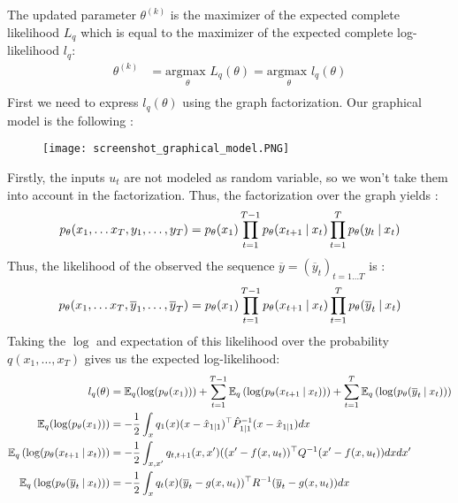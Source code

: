 The updated parameter $\theta^{(k)}$ is the maximizer of the expected complete likelihood $L_q$ which is equal to the maximizer of the expected complete log-likelihood $l_q$:
\begin{align*}
  \theta^{(k)} &= \underset{\theta}{\text{argmax }}L_q(\theta) = \underset{\theta}{\text{argmax }}l_q(\theta)\\
\end{align*}
First we need to express $l_q(\theta)$ using the graph factorization.
Our graphical model is the following :
\begin{figure}[H]
	\texttt{[image: screenshot\_graphical\_model.PNG]}
\end{figure}
Firstly, the inputs $u_t$ are not modeled as random variable, so we won't take them into account in the factorization.
Thus, the factorization over the graph yields :
\begin{align*}
p_{\theta}(x_1, \ldots x_T, y_1, \ldots , y_T) &= p_{\theta}(x_1) \prod_{t=1}^{T-1}{p_{\theta}(x_{t+1} \mathbin{\vert} x_t)} \prod_{t=1}^{T}{p_{\theta}(y_t \mathbin{\vert} x_t)}\\
\end{align*}
Thus, the likelihood of the observed the sequence $\overline{y} = (\overline{y}_t)_{t=1 \ldots T}$ is :
\begin{align*}
  p_{\theta}(x_1, \ldots x_T, \overline{y}_1, \ldots , \overline{y}_T) &= p_{\theta}(x_1) \prod_{t=1}^{T-1}{p_{\theta}(x_{t+1}\mathbin{\vert} x_t)} \prod_{t=1}^{T}{p_{\theta}(\overline{y}_t \mathbin{\vert} x_t)}\\
\end{align*}
Taking the $\log$ and expectation of this likelihood over the probability $q \left(x_1, \ldots ,x_T \right)$ gives us the expected log-likelihood:
\begin{align*}
  l_q(\theta) & =
    \mathbb{E}_q(\log(p_{\theta}(x_1))) +
    \sum_{t=1}^{T-1}{\mathbb{E}_q \left( \log(p_{\theta}(x_{t+1} \mathbin{\vert} x_t)) \right)} +
    \sum_{t=1}^{T}{\mathbb{E}_q\left( \log(p_{\theta}(\overline{y}_t \mathbin{\vert} x_t)) \right)}
  \\
  \mathbb{E}_q(\log(p_{\theta}(x_1))) &= -\frac{1}{2}\int_x{q_1(x) (x - \hat{x}_{1 \mathbin{\vert} 1})^{\top} \hat{P}_{1 \mathbin{\vert} 1}^{-1} (x - \hat{x}_{1 \mathbin{\vert} 1}) dx}
  \\
  \mathbb{E}_q \left( \log(p_{\theta}(x_{t+1} \mathbin{\vert} x_t)) \right) &= -\frac{1}{2}\int_{x,x'}{q_{t,t+1}(x, x') ((x' - f(x,u_t))^{\top} Q^{-1} (x' - f(x,u_t)) dxdx'}\\
  \mathbb{E}_q\left( \log(p_{\theta}(\overline{y}_t \mathbin{\vert} x_t)) \right) &= -\frac{1}{2}\int_x{q_t(x) (\overline{y}_t - g(x, u_t))^{\top} R^{-1} (\overline{y}_t - g(x, u_t)) dx}\\
\end{align*}
